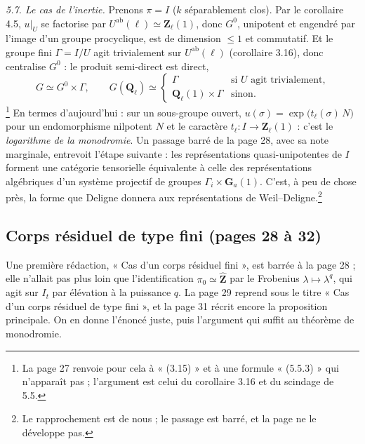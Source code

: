 \documentclass[11pt,a4paper]{article}
\begin{document}
\emph{5.7. Le cas de l'inertie.} Prenons $\pi = I$ ($k$ séparablement clos). Par
le corollaire 4.5, $u|_U$ se factorise par $U^{\mathrm{ab}}(\ell) \simeq
\mathbf{Z}_\ell(1)$, donc $G^0$, unipotent et engendré par l'image d'un groupe
procyclique, est de dimension $\leq 1$ et commutatif. Et le groupe fini
$\Gamma = I/U$ agit trivialement sur $U^{\mathrm{ab}}(\ell)$ (corollaire 3.16),
donc centralise $G^0$ : le produit semi-direct est direct,
\[
  G \simeq G^0 \times \Gamma, \qquad
  G(\mathbf{Q}_\ell) \simeq
  \begin{cases} \Gamma & \text{si $U$ agit trivialement,}\\
  \mathbf{Q}_\ell(1) \times \Gamma & \text{sinon.}\end{cases}
\]
\footnote{La page 27 renvoie pour cela à « (3.15) » et à une formule « (5.5.3) »
qui n'apparaît pas ; l'argument est celui du corollaire 3.16 et du scindage
de 5.5.} En termes d'aujourd'hui : sur un sous-groupe ouvert,
$u(\sigma) = \exp\bigl(t_\ell(\sigma)\,N\bigr)$ pour un endomorphisme nilpotent
$N$ et le caractère $t_\ell : I \to \mathbf{Z}_\ell(1)$ : c'est le
\emph{logarithme de la monodromie}. Un passage barré de la page 28, avec sa
note marginale, entrevoit l'étape suivante : les représentations
quasi-unipotentes de $I$ forment une catégorie tensorielle équivalente à celle
des représentations algébriques d'un système projectif de groupes
$\Gamma_i \times \mathbf{G}_a(1)$. C'est, à peu de chose près, la forme que
Deligne donnera aux représentations de Weil--Deligne.\footnote{Le
rapprochement est de nous ; le passage est barré, et la page ne le développe
pas.}

\subsection*{Corps résiduel de type fini (pages 28 à 32)}

Une première rédaction, « Cas d'un corps résiduel fini », est barrée à la page
28 ; elle n'allait pas plus loin que l'identification $\pi_0 \simeq
\widehat{\mathbf{Z}}$ par le Frobenius $\lambda \mapsto \lambda^q$, qui agit sur
$I_t$ par élévation à la puissance $q$. La page 29 reprend sous le titre « Cas
d'un corps résiduel de type fini », et la page 31 récrit encore la proposition
principale. On en donne l'énoncé juste, puis l'argument qui suffit au théorème
de monodromie.
\end{document}

